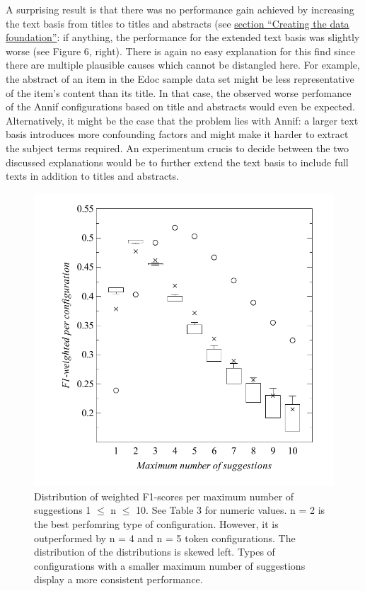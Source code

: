 A surprising result is that there was no performance gain achieved by
increasing the text basis from titles to titles and abstracts (see
\protect\hyperlink{creating-the-data-foundation}{section ``Creating the
data foundation''}: if anything, the performance for the extended text
basis was slightly worse (see Figure 6, right). There is again no easy
explanation for this find since there are multiple plausible causes
which cannot be distangled here. For example, the abstract of an item in
the Edoc sample data set might be less representative of the item's
content than its title. In that case, the observed worse perfomance of
the Annif configurations based on title and abstracts would even be
expected. Alternatively, it might be the case that the problem lies with
Annif: a larger text basis introduces more confounding factors and might
make it harder to extract the subject terms required. An experimentum
crucis to decide between the two discussed explanations would be to
further extend the text basis to include full texts in addition to
titles and abstracts.

\begin{figure}
\centering
\includegraphics{images/metrics_all_n.pdf}
\caption{Distribution of weighted F1-scores per maximum number of
suggestions 1 \(\leq\) n \(\leq\) 10. See Table 3 for numeric values. n
= 2 is the best perfomring type of configuration. However, it is
outperformed by n = 4 and n = 5 token configurations. The distribution
of the distributions is skewed left. Types of configurations with a
smaller maximum number of suggestions display a more consistent
performance.}
\end{figure}


